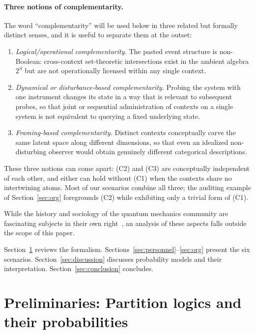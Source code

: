 \documentclass[aps,pra,twocolumn,superscriptaddress,floatfix,longbibliography]{revtex4-2}
\begin{document}
\paragraph{Three notions of complementarity.}
The word ``complementarity'' will be used below in three related but
formally distinct senses, and it is useful to separate them at the
outset:
\begin{enumerate}
\item[(C1)] \emph{Logical/operational complementarity.} The pasted
event structure is non-Boolean: cross-context set-theoretic
intersections exist in the ambient algebra $2^S$ but are not
operationally licensed within any single context.
\item[(C2)] \emph{Dynamical or disturbance-based complementarity.}
Probing the system with one instrument changes its state in a way
that is relevant to subsequent probes, so that joint or sequential
administration of contexts on a single system is not equivalent to
querying a fixed underlying state.
\item[(C3)] \emph{Framing-based complementarity.} Distinct contexts
conceptually carve the same latent space along different dimensions,
so that even an idealized non-disturbing observer would obtain
genuinely different categorical descriptions.
\end{enumerate}
These three notions can come apart: (C2) and (C3) are conceptually
independent of each other, and either can hold without (C1) when the
contexts share no intertwining atoms. Most of our scenarios combine
all three; the auditing example of Section~\ref{sec:org} foregrounds
(C2) while exhibiting only a trivial form of (C1).

While the history and sociology of the quantum mechanics community
are fascinating subjects in their own right~\cite{Howard2004-HOWWIT,
Cabello-2015-madness}, an analysis of these aspects falls outside
the scope of this paper.

Section~\ref{sec:prelim} reviews the formalism.
Sections~\ref{sec:personnel}--\ref{sec:org} present the six
scenarios. Section~\ref{sec:discussion} discusses probability
models and their interpretation. Section~\ref{sec:conclusion}
concludes.

\section{Preliminaries: Partition logics and their probabilities}
\label{sec:prelim}
\end{document}
